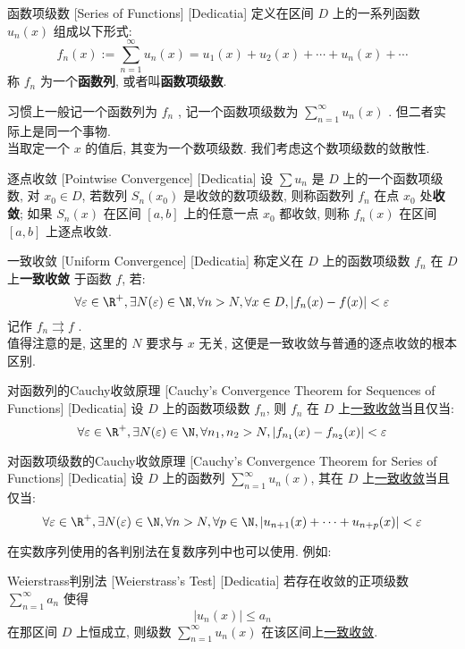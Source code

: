 \documentclass[UTF8]{ctexart}
\newcommand{\UniformConvergence}{\hyperref[dfn:UniformConvergence]{一致收敛}}
\begin{document}
\begin{dfn}
    [UUID]
    {函数项级数}
    [Series of Functions]
    [Dedicatia]
    定义在区间 \( D \) 上的一系列函数 \( u_n(x) \) 组成以下形式: \[f_n(x):=\sum_{n = 1}^{\infty} u_n(x)=u_1(x)+u_2(x)+\cdots+u_n(x)+\cdots \]
    称 \( f_n \) 为一个\textbf{函数列}, 或者叫\textbf{函数项级数}. 
\end{dfn}
习惯上一般记一个函数列为 \( f_n \) , 记一个函数项级数为 \( \sum_{n = 1}^{\infty} u_n(x)  \) . 但二者实际上是同一个事物. \\
当取定一个 \( x \) 的值后, 其变为一个数项级数. 我们考虑这个数项级数的敛散性. 
\begin{dfn}
    [UUID]
    {逐点收敛}
    [Pointwise Convergence]
    [Dedicatia]
    设 \(\sum u_n\) 是 \(D\) 上的一个函数项级数, 对 \(x_0\in D\), 若数列 \(S_n(x_0)\) 是收敛的数项级数, 则称函数列 \(f_n\) 在点 \(x_0\) 处\textbf{收敛}; 如果 \( S_n(x) \) 在区间 \( [a,b] \) 上的任意一点 \( x_0 \) 都收敛, 则称 \( f_n(x) \) 在区间 \( [a,b] \) 上逐点收敛. 
\end{dfn}
\begin{dfn}
    [UniformConvergence]
    {一致收敛}
    [Uniform Convergence]
    [Dedicatia]
    称定义在 \(D\) 上的函数项级数 \(f_n\) 在 \(D\) 上\textbf{一致收敛} 于函数 \(f\), 若: 
    \[\forall\varepsilon\in\R^+, \exists N(\varepsilon)\in\N, \forall n>N, \forall x\in D, |f_n(x)-f(x)|<\varepsilon\]
    记作 \( f_n\rightrightarrows f \) .\\
    值得注意的是, 这里的 \( N \) 要求与 \( x \) 无关, 这便是一致收敛与普通的逐点收敛的根本区别. 
\end{dfn}
\begin{crl}
    [UUID]
    {对函数列的Cauchy收敛原理}
    [Cauchy's Convergence Theorem for Sequences of Functions]
    [Dedicatia]
    设 \(D\) 上的函数项级数 \(f_n\), 则 \(f_n\) 在 \(D\) 上\UniformConvergence 当且仅当: 
	\[\forall\varepsilon\in\R^+, \exists N(\varepsilon)\in\N, \forall n_1,n_2>N, |f_{n_1}(x)-f_{n_2}(x)|<\varepsilon\]
\end{crl}
\begin{crl}
    [UUID]
    {对函数项级数的Cauchy收敛原理}
    [Cauchy's Convergence Theorem for Series of Functions]
    [Dedicatia]
    设 \(D\) 上的函数列 \(\sum_{n=1}^{\infty} u_n(x)\), 其在 \(D\) 上\UniformConvergence 当且仅当: 
	\[\forall\varepsilon\in\R^+, \exists N(\varepsilon)\in\N, \forall n>N, \forall p\in\N, |u_{n+1}(x)+\cdots+u_{n+p}(x)|<\varepsilon\]
\end{crl}
在实数序列使用的各判别法在复数序列中也可以使用. 例如: 
\begin{thm}
    [UUID]
    {Weierstrass判别法}
    [Weierstrass's Test]
    [Dedicatia]
    若存在收敛的正项级数 \( \sum_{n = 1}^{\infty} a_n  \) 使得\[|u_n(x)|\leqslant a_n\]
    在那区间 \( D \) 上恒成立, 则级数 \( \sum_{n = 1}^{\infty} u_n(x)  \) 在该区间上\UniformConvergence . 
\end{thm}
\end{document}
